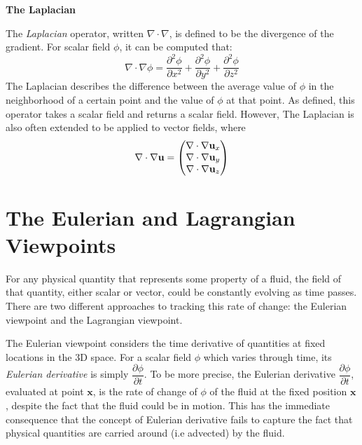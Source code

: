 \textbf{The Laplacian}

\gapS

The \textit{Laplacian} operator, written $\nabla \cdot \nabla$, is defined to be the divergence of the gradient. For scalar field $\phi$, it can be computed that:
$$
\nabla \cdot \nabla \phi = 
\frac{\partial ^2 \phi}{\partial x^2}+
\frac{\partial ^2 \phi}{\partial y^2}+
\frac{\partial ^2 \phi}{\partial z^2}
$$
The Laplacian describes the difference between the average value of $\phi$ in the neighborhood of a certain point and the value of $\phi$ at that point. As defined, this operator takes a scalar field and returns a scalar field. However, The Laplacian is also often extended to be applied to vector fields, where 
$$
\nabla \cdot \nabla \textbf{u} =
    \begin{pmatrix}
        \nabla \cdot \nabla \textbf{u}_x \\
        \nabla \cdot \nabla \textbf{u}_y \\
        \nabla \cdot \nabla \textbf{u}_z
    \end{pmatrix}
$$


\section{The Eulerian and Lagrangian Viewpoints}

For any physical quantity that represents some property of a fluid, the field of that quantity, either scalar or vector, could be constantly evolving as time passes. There are two different approaches to tracking this rate of change: the Eulerian viewpoint and the Lagrangian viewpoint.

The Eulerian viewpoint considers the time derivative of quantities at fixed locations in the 3D space. For a scalar field $\phi$ which varies through time, its \textit{Eulerian derivative} is simply $\dfrac{\partial \phi}{\partial t}$. To be more precise, the Eulerian derivative $\dfrac{\partial \phi}{\partial t}$, evaluated at point $\textbf{x}$, is the rate of change of $\phi$ of the fluid at the fixed position $\textbf{x}$, despite the fact that the fluid could be in motion. This has the immediate consequence that the concept of Eulerian derivative fails to capture the fact that physical quantities are carried around (i.e advected) by the fluid. 

